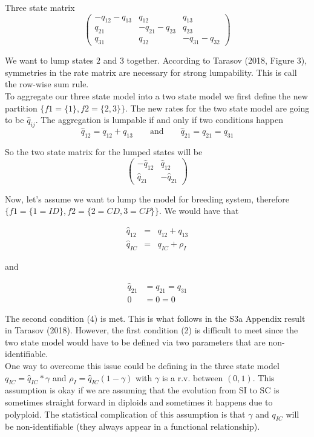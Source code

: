 \documentclass{article}
\begin{document}
Three state matrix
$$
\begin{pmatrix} 
-q_{12}-q_{13} & q_{12} & q_{13} \\
q_{21} & -q_{21}-q_{23} & q_{23}\\
q_{31} & q_{32} & -q_{31}-q_{32} 
\end{pmatrix}
$$

We want to lump states $2$ and $3$ together. According to Tarasov (2018, Figure 3), symmetries in the rate matrix are necessary for strong lumpability. This is call the row-wise sum rule.\\
To aggregate our three state model into a two state model we first define the new partition $\{f1=\{1\},f2=\{2,3\}\}$. The new rates for the two state model are going to be $\hat{q}_{ij}$. The aggregation is lumpable if and only if two conditions happen
$$ \hat{q}_{12}=q_{12}+q_{13} \qquad \textrm{and} \qquad \hat{q}_{21}=q_{21}=q_{31}$$

So the two state matrix for the lumped states will be
$$
\begin{pmatrix} 
-\hat{q}_{12} &\hat{q}_{12} \\
\hat{q}_{21} & -\hat{q}_{21}
\end{pmatrix}
$$

Now, let's assume we want to lump the model  for breeding system, therefore $\{f1=\{1=ID\}, f2=\{2=CD,3=CP\}\}$. We would have that

\begin{eqnarray}
 \hat{q}_{12} & = &q_{12}+q_{13}\\
\hat{q}_{IC}& = & q_{IC}+\rho_I \label{firstcondition}
\end{eqnarray}

and 

\begin{eqnarray}\label{secondcondition}
\hat{q}_{21}&=q_{21}=q_{31}\\
0 & =0=0 \label{firstcondition}
\end{eqnarray}

The second condition (4) is met. This is what follows in the S3a Appendix result in Tarasov (2018). However, the first condition (2) is difficult to meet since the two state model would have to be defined via two parameters that are non-identifiable.\\

One way to overcome this issue could be defining in the three state model $q_{IC}=\hat{q}_{IC}*\gamma$ and $\rho_I=\hat{q}_{IC}(1-\gamma)$ with $\gamma$ is a r.v. between $(0,1)$. This assumption is okay if we are assuming that the evolution from SI to SC is sometimes straight forward in diploids and sometimes it happens due to polyploid. The statistical complication of this assumption is that $\gamma$ and $q_{IC}$ will be non-identifiable (they always appear in a functional relationship).  
\end{document}
